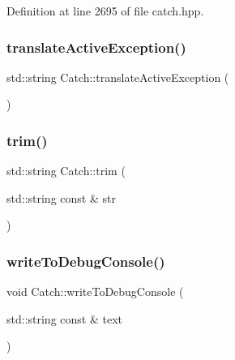 Definition at line 2695 of file catch.\+hpp.

\hypertarget{namespace_catch_adafff91485eeeeb9e9333f317cc0e3b1}{}\label{namespace_catch_adafff91485eeeeb9e9333f317cc0e3b1} 
\subsubsection{\texorpdfstring{translate\+Active\+Exception()}{translateActiveException()}}
{\footnotesize\ttfamily std\+::string Catch\+::translate\+Active\+Exception (\begin{DoxyParamCaption}{ }\end{DoxyParamCaption})}

\hypertarget{namespace_catch_a084108b47f37d8bfd5db51c50c7451b3}{}\label{namespace_catch_a084108b47f37d8bfd5db51c50c7451b3} 
\subsubsection{\texorpdfstring{trim()}{trim()}}
{\footnotesize\ttfamily std\+::string Catch\+::trim (\begin{DoxyParamCaption}\item[{std\+::string const \&}]{str }\end{DoxyParamCaption})}

\hypertarget{namespace_catch_aa5dcf4750ce9a854f4b74d3c952d13cc}{}\label{namespace_catch_aa5dcf4750ce9a854f4b74d3c952d13cc} 
\subsubsection{\texorpdfstring{write\+To\+Debug\+Console()}{writeToDebugConsole()}}
{\footnotesize\ttfamily void Catch\+::write\+To\+Debug\+Console (\begin{DoxyParamCaption}\item[{std\+::string const \&}]{text }\end{DoxyParamCaption})}

